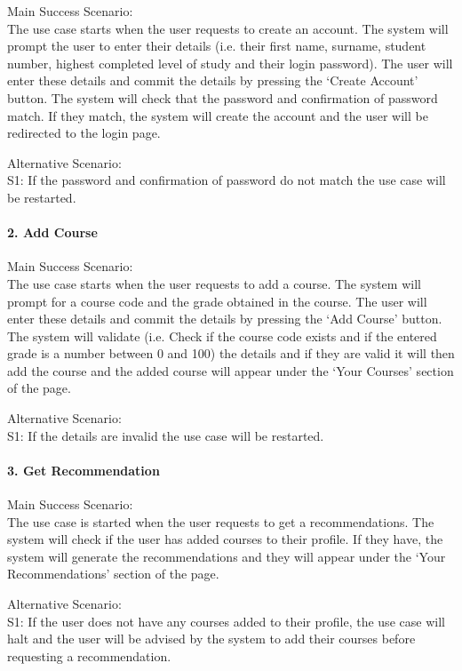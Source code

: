 \documentclass[10pt]{article}
\begin{document}
Main Success Scenario: \\
The use case starts when the user requests to create an account. The system will prompt the user to enter their details (i.e. their first name, surname, student number, highest completed level of study and their login password). The user will enter these details and commit the details by pressing the ‘Create Account’ button. The system will check that the password and confirmation of password match. If they match, the system will create the account and the user will be redirected to the login page.

Alternative Scenario: \\
S1: If the password and confirmation of password do not match the use case will be restarted.

\paragraph{2. Add Course \\}

Main Success Scenario: \\
The use case starts when the user requests to add a course. The system will prompt for a course code and the grade obtained in the course. The user will enter these details and  commit the details by pressing the ‘Add Course’ button. The system will validate (i.e. Check if the course code exists and if the entered grade is a number between 0 and 100) the details and if they are valid it will then add the course and the added course will appear under the ‘Your Courses’ section of the page.

Alternative Scenario: \\
S1: If the details are invalid the use case will be restarted.

\paragraph{3. Get Recommendation \\}

Main Success Scenario:\\
The use case is started when the user requests to get a recommendations. The system will check if the user has added courses to their profile. If they have, the system will generate the recommendations and they will appear under the ‘Your Recommendations’ section of the page.

Alternative Scenario:\\
S1: If the user does not have any courses added to their profile, the use case will halt and the user will be advised by the system to add their courses before requesting a recommendation.
\end{document}
